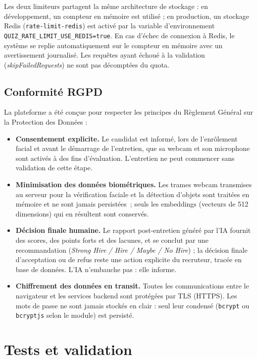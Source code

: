 Les deux limiteurs partagent la même architecture de stockage : en développement, un compteur
en mémoire est utilisé ; en production, un stockage Redis (\texttt{rate-limit-redis}) est activé
par la variable d'environnement \texttt{QUIZ\_RATE\_LIMIT\_USE\_REDIS=true}. En cas d'échec de
connexion à Redis, le système se replie automatiquement sur le compteur en mémoire avec un
avertissement journalisé. Les requêtes ayant échoué à la validation (\textit{skipFailedRequests})
ne sont pas décomptées du quota.

\subsection{Conformité RGPD}

La plateforme a été conçue pour respecter les principes du Règlement Général sur la Protection
des Données :

\begin{itemize}
  \item \textbf{Consentement explicite.} Le candidat est informé, lors de l'enrôlement facial
        et avant le démarrage de l'entretien, que sa webcam et son microphone sont activés
        à des fins d'évaluation. L'entretien ne peut commencer sans validation de cette étape.
  \item \textbf{Minimisation des données biométriques.} Les trames webcam transmises au
        serveur pour la vérification faciale et la détection d'objets sont traitées en
        mémoire et ne sont jamais persistées~; seuls les embeddings (vecteurs de
        512 dimensions) qui en résultent sont conservés.
  \item \textbf{Décision finale humaine.} Le rapport post-entretien généré par l'IA fournit
        des scores, des points forts et des lacunes, et se conclut par une recommandation
        (\textit{Strong Hire / Hire / Maybe / No Hire}) ; la décision finale
        d'acceptation ou de refus reste une action explicite du recruteur, tracée en base de
        données. L'IA n'embauche pas : elle informe.
  \item \textbf{Chiffrement des données en transit.} Toutes les communications entre le
        navigateur et les services backend sont protégées par TLS (HTTPS). Les mots de
        passe ne sont jamais stockés en clair : seul leur condensé (\texttt{bcrypt} ou
        \texttt{bcryptjs} selon le module) est persisté.
\end{itemize}

\section{Tests et validation}

